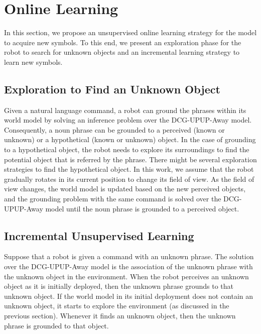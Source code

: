 \section{Online Learning}
\label{sec:implementation}
In this section, we propose an unsupervised online learning strategy for the model to acquire new symbols. To this end, we present an exploration phase for the robot to search for unknown objects and an incremental learning strategy to learn new symbols.
\subsection{Exploration to Find an Unknown Object}
Given a natural language command, a robot can ground the phrases within its world model by solving an inference problem over the DCG-UPUP-Away model. Consequently, a noun phrase can be grounded to a perceived (known or unknown) or a hypothetical (known or unknown) object. In the case of grounding to a hypothetical object, the robot needs to explore its surroundings to find the potential object that is referred by the phrase. There might be several exploration strategies to find the hypothetical object. In this work, we assume that the robot gradually rotates in its current position to change its field of view. As the field of view changes, the world model is updated based on the new perceived objects, and the grounding problem with the same command is solved over the DCG-UPUP-Away model until the noun phrase is grounded to a perceived object.   


\subsection{Incremental Unsupervised Learning}
Suppose that a robot is given a command with an unknown phrase. The solution over the DCG-UPUP-Away model is the association of the unknown phrase with the unknown object in the environment. When the robot perceives an unknown object as it is initially deployed, then the unknown phrase grounds to that unknown object. If the world model in its initial deployment does not contain an unknown object, it starts to explore the environment (as discussed in the previous section). Whenever it finds an unknown object, then the unknown phrase is grounded to that object. 

